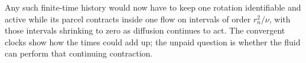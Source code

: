 Any such finite-time history would now have to keep one rotation identifiable and active while its parcel contracts inside one flow on intervals of order \(r_n^2/\nu\), with those intervals shrinking to zero as diffusion continues to act. The convergent clocks show how the times could add up; the unpaid question is whether the fluid can perform that continuing contraction.
